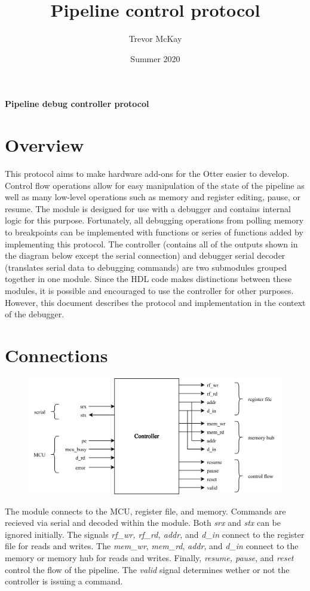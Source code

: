 \documentclass[10pt,a4paper]{article}
\title{Pipeline control protocol}
\author{Trevor McKay}
\date{Summer 2020}
\begin{document}
\begin{center}
    \Large\textbf{Pipeline debug controller protocol}
\end{center}

\section{Overview}

This protocol aims to make hardware add-ons for the Otter easier to develop. Control flow operations
allow for easy manipulation of the state of the pipeline as well as many low-level operations such
as memory and register editing, pause, or resume. The module is designed for use with a debugger and
contains internal logic for this purpose. Fortunately, all debugging operations from polling memory
to breakpoints can be implemented with functions or series of functions added by implementing this
protocol. The controller (contains all of the outputs shown in the diagram below except the serial
connection) and debugger serial decoder (translates serial data to debugging commands) are two
submodules grouped together in one module. Since the HDL code makes distinctions between these modules,
it is possible and encouraged to use the controller for other purposes. However, this document
describes the protocol and implementation in the context of the debugger.

\section{Connections}

\begin{figure}[H]
    \includegraphics[width=\textwidth]{pipeline_db}
\end{figure}
\medskip

The module connects to the MCU, register file, and memory. Commands are recieved via serial and
decoded within the module. Both \emph{srx} and \emph{stx} can be ignored initially. The signals \emph{rf\_wr, rf\_rd, addr,} and
\emph{d\_in} connect to the register file for reads and writes. The \emph{mem\_wr}, \emph{mem\_rd},
\emph{addr}, and \emph{d\_in} connect to the memory or memory hub for reads and writes. Finally,
\emph{resume, pause}, and \emph{reset} control the flow of the pipeline. The \emph{valid} signal
determines wether or not the controller is issuing a command.
\end{document}
